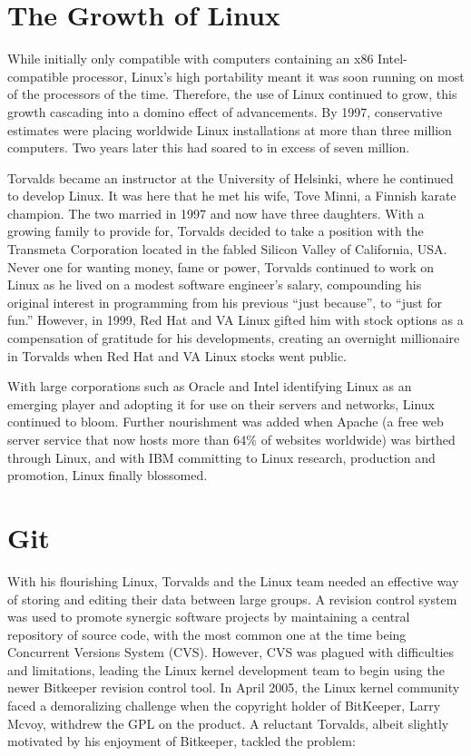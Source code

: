 \documentclass{article}
\begin{document}
\section{The Growth of Linux} While initially only compatible with computers containing an x86 Intel-compatible processor, Linux's high portability meant it was soon running on most of the processors of the time. Therefore, the use of Linux continued to grow, this growth cascading into a domino effect of advancements. By 1997, conservative estimates were placing worldwide Linux installations at more than three million computers. Two years later this had soared to in excess of seven million.\cite{figures} \newline \newline

Torvalds became an instructor at the University of Helsinki, where he continued to develop Linux. It was here that he met his wife, Tove Minni, a Finnish karate champion. The two married in 1997 and now have three daughters. With a growing family to provide for, Torvalds decided to take a position with the Transmeta Corporation located in the fabled Silicon Valley of California, USA. Never one for wanting money, fame or power, Torvalds continued to work on Linux  as he lived on a modest software engineer's salary, compounding his original interest in programming from his previous ``just because'', to ``just for fun.''\cite{book} However, in 1999, Red Hat and VA Linux gifted him with stock options as a compensation of gratitude for his developments, creating an overnight millionaire in Torvalds when Red Hat and VA Linux stocks went public.\cite{book} \newline \newline

With large corporations such as Oracle and Intel identifying Linux as an emerging player and adopting it for use on their servers and networks, Linux continued to bloom. Further nourishment was added when Apache (a free web server service that now hosts more than 64\% of websites worldwide) was birthed through Linux, and with IBM committing to Linux research, production and promotion, Linux finally blossomed. 

\section{Git} With his flourishing Linux, Torvalds and the Linux team needed an effective way of storing and editing their data between large groups. A revision control system was used to promote synergic software projects by maintaining a central repository of source code, with the most common one at the time being Concurrent Versions System (CVS). However, CVS was plagued with difficulties and limitations, leading the Linux kernel development team to begin using the newer Bitkeeper revision control tool. In April 2005, the Linux kernel community faced a demoralizing challenge when the copyright holder of BitKeeper, Larry Mcvoy, withdrew the GPL on the product. A reluctant Torvalds, albeit slightly motivated by his enjoyment of Bitkeeper, tackled the problem: \newline 
\end{document}
